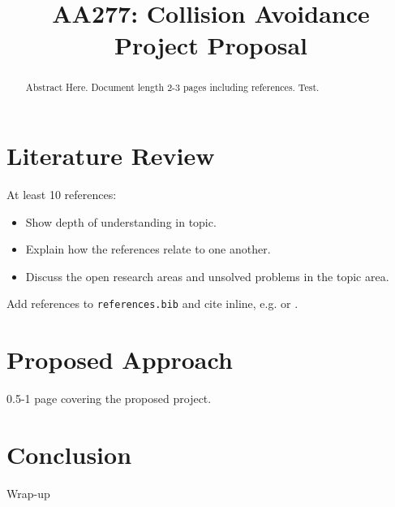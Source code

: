 \documentclass[conference]{IEEEtran}
\begin{document}
\title{AA277: Collision Avoidance Project Proposal\\
}

\author{
\and
{}
\and
{}
\and
{}
}

\maketitle

\begin{abstract}
Abstract Here. Document length 2-3 pages including references. Test.
\end{abstract}

\section{Literature Review}
At least 10 references: \begin{itemize}
    \item Show depth of understanding in topic.
    \item Explain how the references relate to one another.
    \item Discuss the open research areas and unsolved problems in the topic area.
\end{itemize}
Add references to \texttt{references.bib} and cite inline, e.g. \cite{eCCA} or \cite{SocialCA, ConfidenceCA}.
\section{Proposed Approach}
0.5-1 page covering the proposed project.
\section{Conclusion}
Wrap-up


\end{document}
